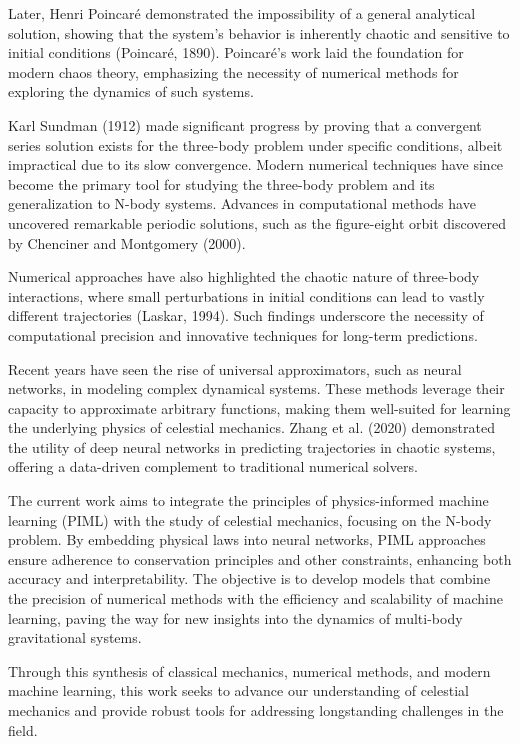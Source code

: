 \documentclass[draft]{agujournal2019}
\begin{document}
Later, Henri Poincaré demonstrated the impossibility of a general analytical solution, showing that the system's behavior is inherently chaotic and sensitive to initial conditions \cite{Poincare}(Poincaré, 1890). Poincaré’s work laid the foundation for modern chaos theory, emphasizing the necessity of numerical methods for exploring the dynamics of such systems.

Karl Sundman (1912) made significant progress by proving that a convergent series solution exists for the three-body problem under specific conditions, albeit impractical due to its slow convergence. Modern numerical techniques have since become the primary tool for studying the three-body problem and its generalization to N-body systems. Advances in computational methods have uncovered remarkable periodic solutions, such as the figure-eight orbit discovered by Chenciner and Montgomery (2000).

Numerical approaches have also highlighted the chaotic nature of three-body interactions, where small perturbations in initial conditions can lead to vastly different trajectories (Laskar, 1994). Such findings underscore the necessity of computational precision and innovative techniques for long-term predictions.

Recent years have seen the rise of universal approximators, such as neural networks, in modeling complex dynamical systems. These methods leverage their capacity to approximate arbitrary functions, making them well-suited for learning the underlying physics of celestial mechanics. Zhang et al. (2020) demonstrated the utility of deep neural networks in predicting trajectories in chaotic systems, offering a data-driven complement to traditional numerical solvers.

The current work aims to integrate the principles of physics-informed machine learning (PIML) with the study of celestial mechanics, focusing on the N-body problem. By embedding physical laws into neural networks, PIML approaches ensure adherence to conservation principles and other constraints, enhancing both accuracy and interpretability. The objective is to develop models that combine the precision of numerical methods with the efficiency and scalability of machine learning, paving the way for new insights into the dynamics of multi-body gravitational systems.

Through this synthesis of classical mechanics, numerical methods, and modern machine learning, this work seeks to advance our understanding of celestial mechanics and provide robust tools for addressing longstanding challenges in the field.
\end{document}
